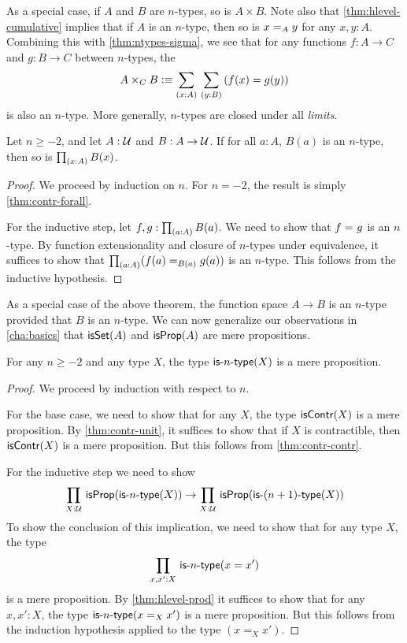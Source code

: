 As a special case, if $A$ and $B$ are $n$-types, so is $A\times B$.
Note also that \autoref{thm:hlevel-cumulative} implies that if $A$ is an $n$-type, then so is $\id[A]xy$ for any $x,y:A$.
Combining this with \autoref{thm:ntypes-sigma}, we see that for any functions $f:A\to C$ and $g:B\to C$ between $n$-types, the 
\[ A\times_C B \defeq \sm{x:A}{y:B} (f(x)=g(y)) \]
is also an $n$-type.
More generally, $n$-types are closed under all \emph{limits}.

\begin{thm}\label{thm:hlevel-prod}
 Let $n\geq -2$, and let $A : \type$ and $B : A \to \type$.
 If for all $a : A$, $B(a)$ is an $n$-type, then so is $\prd{x : A} B(x)$.
\end{thm}

\begin{proof}
  We proceed by induction on $n$.
  For $n = -2$, the result is simply \autoref{thm:contr-forall}.

  For the inductive step, let $f, g : \prd{a:A}B(a)$.
  We need to show that $\id{f}{g}$ is an $n$-type.
  By function extensionality and closure of $n$-types under equivalence, it suffices to show that $\prd{a : A} (\id[B(a)]{f(a)}{g(a)})$ is an $n$-type.
  This follows from the inductive hypothesis.
\end{proof}

As a special case of the above theorem, the function space $A \to B$ is an $n$-type provided that $B$ is an $n$-type.
We can now generalize our observations in \autoref{cha:basics} that $\isset(A)$ and $\isprop(A)$ are mere propositions.

\begin{thm}\label{thm:isaprop-isofhlevel}
 For any $n \geq -2$ and any type $X$, the type $\istype{n}(X)$ is a mere proposition.
\end{thm}
\begin{proof}
  We proceed by induction with respect to $n$.

 For the base case, we need to show that for any $X$, the type $\iscontr(X)$ is a mere proposition.
 By \autoref{thm:contr-unit}, it suffices to show that if $X$ is contractible, then $\iscontr(X)$ is a mere proposition.
 But this follows from \autoref{thm:contr-contr}.

For the inductive step we need to show
\[\prd{X : \type} \isprop (\istype{n}(X)) \to \prd{X : \type} \isprop (\istype{\nplusone}(X)) \]
To show the conclusion of this implication, we need to show that for any type $X$, the type
\[\prd{x, x' : X}\istype{n}(x = x')\]
is a mere proposition. By \autoref{thm:hlevel-prod} it suffices to show that for any $x, x' : X$, the type $\istype{n}(x =_X x')$ is a mere
proposition.
But this follows from the induction hypothesis applied to the type $(x =_X x')$.
\end{proof}

